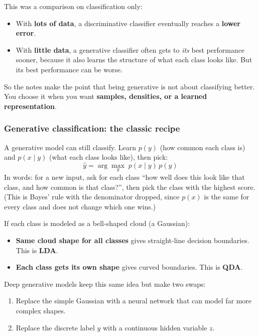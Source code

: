 This was a comparison on classification only:
\begin{itemize}
  \item With \textbf{lots of data}, a discriminative classifier eventually reaches a \textbf{lower error}.
  \item With \textbf{little data}, a generative classifier often gets to \emph{its} best performance sooner, because it also learns the structure of what each class looks like. But its best performance can be worse.
\end{itemize}
So the notes make the point that being generative is not about classifying better. You choose it when you want \textbf{samples, densities, or a learned representation}.

\subsubsection*{Generative classification: the classic recipe}

A generative model can still classify. Learn $p(y)$ (how common each class is) and $p(x \mid y)$ (what each class looks like), then pick:
\[
\hat{y} = \arg\max_{y}\; p(x \mid y)\, p(y)
\]
In words: for a new input, ask for each class ``how well does this look like that class, and how common is that class?'', then pick the class with the highest score. (This is Bayes' rule with the denominator dropped, since $p(x)$ is the same for every class and does not change which one wins.)

If each class is modeled as a bell-shaped cloud (a Gaussian):
\begin{itemize}
  \item \textbf{Same cloud shape for all classes} gives straight-line decision boundaries. This is \textbf{LDA}.
  \item \textbf{Each class gets its own shape} gives curved boundaries. This is \textbf{QDA}.
\end{itemize}

Deep generative models keep this same idea but make two swaps:
\begin{enumerate}
  \item Replace the simple Gaussian with a neural network that can model far more complex shapes.
  \item Replace the discrete label $y$ with a continuous hidden variable $z$.
\end{enumerate}